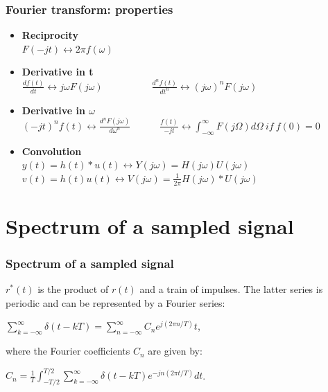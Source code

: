 \begin{frame}
	\frametitle{Fourier transform: properties}
	\begin{itemize}
		\item \textbf{Reciprocity} \\
		\medskip
		$F(-jt) \leftrightarrow  2 \pi f(\omega)$
		\medskip
		\item \textbf{Derivative in t} \\
		\medskip
		$\frac{df(t)}{dt} \leftrightarrow j\omega F(j\omega) \qquad \qquad \quad \frac{d^nf(t)}{dt^n} \leftrightarrow (j\omega)^n F(j\omega)$
		\medskip
		\item \textbf{Derivative in $\omega$} \\
		\medskip
		$(-jt)^n f(t) \leftrightarrow \frac{d^n F(j\omega)}{d\omega^n} \qquad \quad \frac{f(t)}{-jt} \leftrightarrow \int_{-\infty}^\infty F(j\Omega) d\Omega \> if \> f(0) = 0$
		\medskip
		\item \textbf{Convolution} \\
		\medskip
		$y(t) = h(t) * u(t) \leftrightarrow Y(j\omega) = H(j\omega) U(j\omega)$\\
		$v(t) = h(t)u(t) \leftrightarrow V(j\omega) = \frac{1}{2\pi} H(j\omega)*U(j\omega)$
	\end{itemize}
\end{frame}

\section{Spectrum of a sampled signal}

\begin{frame}
	\frametitle{Spectrum of a sampled signal}
	$r^*(t)$ is the product of $r(t)$ and a train of impulses. The latter series is periodic and can be represented by a Fourier series:\\
	\begin{center}
		$\sum_{k=-\infty}^{\infty} \delta(t-kT) = \sum_{n=-\infty}^{\infty} C_ne^{j(2\pi n/T)}t$,
	\end{center}
	where the Fourier coefficients $C_n$ are given by:\\
	\begin{center}
		$C_n=\frac{1}{T}\int_{-T/2}^{T/2} \sum_{k=-\infty}^{\infty} \delta(t-kT)e^{-jn(2\pi t/T)}dt$.
	\end{center}
	
\end{frame}

